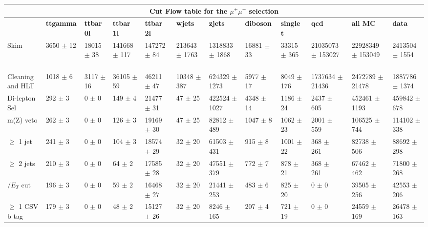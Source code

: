 \begin{table}
  \centering 
\resizebox{\columnwidth}{!} {

\begin{tabular}{|l|l|l|l|l|l|l|l|l|l|l|l|}
\hline
\multicolumn{12}{|c|}{\textbf{Cut Flow table for the $\mu^+\mu^-$ selection}} \\
\hline
& \textbf{ttgamma} & \textbf{ttbar 0l} & \textbf{ttbar 1l} & \textbf{ttbar 2l} & \textbf{wjets} & \textbf{zjets} & \textbf{diboson} & \textbf{single t} & \textbf{qcd} & \textbf{all MC} & \textbf{data} \\
\hline
Skim & 3650 $\pm$ 12 \ & 18015 $\pm$ 38 \ & 141668 $\pm$ 117 \ & 147272 $\pm$ 84 \ & 213643 $\pm$ 1763 \ & 1318833 $\pm$ 1868 \ & 16881 $\pm$ 33 \ & 33315 $\pm$ 365 \ & 21035073 $\pm$ 153027\ & 22928349 $\pm$ 153049 \ & 2413504 $\pm$ 1554 \\
Cleaning and HLT & 1018 $\pm$ 6 \ & 3117 $\pm$ 16 \ & 36105 $\pm$ 59 \ & 46211 $\pm$ 47 \ & 10348 $\pm$ 387 \ & 624329 $\pm$ 1273 \ & 5977 $\pm$ 17 \ & 8049 $\pm$ 176 \ & 1737634 $\pm$ 21436\ & 2472789 $\pm$ 21478 \ & 1887786 $\pm$ 1374 \\
Di-lepton Sel & 292 $\pm$ 3 \ & 0 $\pm$ 0 \ & 149 $\pm$ 4 \ & 21477 $\pm$ 31 \ & 47 $\pm$ 25 \ & 422524 $\pm$ 1027 \ & 4348 $\pm$ 14 \ & 1186 $\pm$ 24 \ & 2437 $\pm$ 605\ & 452461 $\pm$ 1193 \ & 459842 $\pm$ 678 \\
m(Z) veto & 262 $\pm$ 3 \ & 0 $\pm$ 0 \ & 126 $\pm$ 3 \ & 19169 $\pm$ 30 \ & 47 $\pm$ 25 \ & 82812 $\pm$ 489 \ & 1047 $\pm$ 8 \ & 1062 $\pm$ 23 \ & 2001 $\pm$ 559\ & 106525 $\pm$ 744 \ & 114102 $\pm$ 338 \\
$\geq$ 1 jet & 241 $\pm$ 3 \ & 0 $\pm$ 0 \ & 104 $\pm$ 3 \ & 18574 $\pm$ 29 \ & 32 $\pm$ 20 \ & 61503 $\pm$ 431 \ & 915 $\pm$ 8 \ & 1001 $\pm$ 22 \ & 368 $\pm$ 261\ & 82738 $\pm$ 506 \ & 88692 $\pm$ 298 \\
$\geq$ 2 jets & 210 $\pm$ 3 \ & 0 $\pm$ 0 \ & 64 $\pm$ 2 \ & 17585 $\pm$ 28 \ & 32 $\pm$ 20 \ & 47551 $\pm$ 379 \ & 772 $\pm$ 7 \ & 878 $\pm$ 21 \ & 368 $\pm$ 261\ & 67462 $\pm$ 462 \ & 71800 $\pm$ 268 \\
$\slash{E_{T}}$ cut & 196 $\pm$ 3 \ & 0 $\pm$ 0 \ & 59 $\pm$ 2 \ & 16468 $\pm$ 27 \ & 32 $\pm$ 20 \ & 21441 $\pm$ 253 \ & 483 $\pm$ 6 \ & 825 $\pm$ 20 \ & 0 $\pm$ 0\ & 39505 $\pm$ 256 \ & 42553 $\pm$ 206 \\
$\geq$ 1 CSV b-tag & 179 $\pm$ 3 \ & 0 $\pm$ 0 \ & 48 $\pm$ 2 \ & 15127 $\pm$ 26 \ & 32 $\pm$ 20 \ & 8246 $\pm$ 165 \ & 207 $\pm$ 4 \ & 721 $\pm$ 19 \ & 0 $\pm$ 0\ & 24559 $\pm$ 169 \ & 26478 $\pm$ 163 \\

\end{tabular}}
\end{table}
